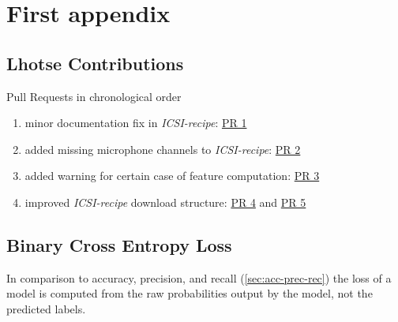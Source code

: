 \documentclass[bsc,frontabs,parskip,deptreport]{infthesis}
\begin{document}







\appendix
\chapter{First appendix}

\section{Lhotse Contributions} \label{app:lhotse-contrib}
Pull Requests in chronological order 
\begin{enumerate}
    \item minor documentation fix in \textit{ICSI-recipe}: \href{https://github.com/lhotse-speech/lhotse/pull/544}{PR 1}
    \item added missing microphone channels to \textit{ICSI-recipe}: \href{https://github.com/lhotse-speech/lhotse/pull/555}{PR 2}
    \item added warning for certain case of feature computation: \href{https://github.com/lhotse-speech/lhotse/pull/561}{PR 3}
    \item improved \textit{ICSI-recipe} download structure: \href{https://github.com/lhotse-speech/lhotse/pull/583}{PR 4} and \href{https://github.com/lhotse-speech/lhotse/pull/592}{PR 5}
\end{enumerate}

\section{Binary Cross Entropy Loss} \label{sec:cross-entropy-loss}
In comparison to accuracy, precision, and recall (\autoref{sec:acc-prec-rec}) the loss of a model is computed from the raw probabilities output by the model, not the predicted labels.
\end{document}
